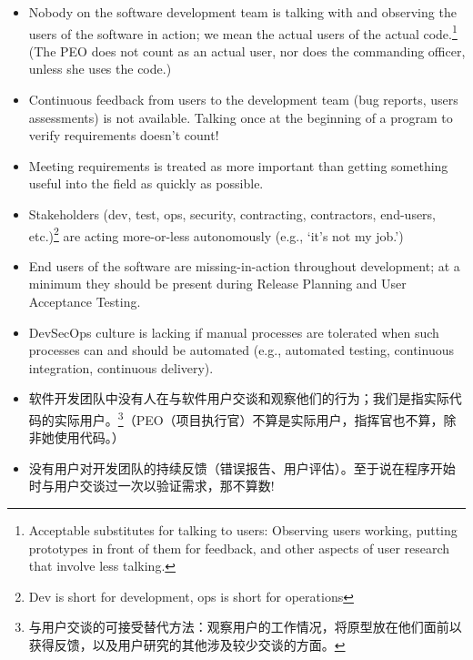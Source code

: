 \documentclass[oneside]{book}
\begin{document}
\begin{paracol}{2}
    \begin{leftcolumn}
        \begin{itemize}
            \item Nobody on the software development team is talking with and observing the users of the software in action; we mean the actual users of the actual code.\footnote*[1]{Acceptable substitutes for talking to users: Observing users working, putting prototypes in front of them for feedback, and other aspects of user research that involve less talking.} (The PEO does not count as an actual user, nor does the commanding officer, unless she uses the code.)
            \item Continuous feedback from users to the development team (bug reports, users assessments) is not available. Talking once at the beginning of a program to verify requirements doesn’t count!
            \item Meeting requirements is treated as more important than getting something useful into the field as quickly as possible.
            \item Stakeholders (dev, test, ops, security, contracting, contractors, end-users, etc.)\footnote*[2]{Dev is short for development, ops is short for operations} are acting more-or-less autonomously (e.g., ‘it’s not my job.’)
            \item End users of the software are missing-in-action throughout development; at a minimum they should be present during Release Planning and User Acceptance Testing.
            \item DevSecOps culture is lacking if manual processes are tolerated when such processes can and should be automated (e.g., automated testing, continuous integration, continuous delivery).
        \end{itemize}
    \end{leftcolumn}
    \begin{rightcolumn}
        \begin{itemize}
            \item 软件开发团队中没有人在与软件用户交谈和观察他们的行为；我们是指实际代码的实际用户。\footnote*[1]{与用户交谈的可接受替代方法：观察用户的工作情况，将原型放在他们面前以获得反馈，以及用户研究的其他涉及较少交谈的方面。}（PEO（项目执行官）不算是实际用户，指挥官也不算，除非她使用代码。）
            \item 没有用户对开发团队的持续反馈（错误报告、用户评估）。至于说在程序开始时与用户交谈过一次以验证需求，那不算数!

\end{itemize}
\end{rightcolumn}
\end{paracol}
\end{document}
